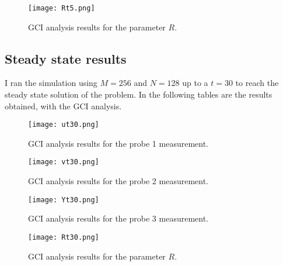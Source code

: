 \begin{figure}[H]
\centering     %
\texttt{[image: Rt5.png]}
\caption{GCI analysis results for the parameter $R$.}
\end{figure}

\subsection*{Steady state results}
I ran the simulation using $M=256$ and $N=128$ up to a $t=30$ to reach the steady state solution of the problem. In the following tables are the results obtained, with the GCI analysis.

\begin{figure}[H]
\centering     %
\texttt{[image: ut30.png]}
\caption{GCI analysis results for the probe 1 measurement.}
\end{figure}

\begin{figure}[H]
\centering     %
\texttt{[image: vt30.png]}
\caption{GCI analysis results for the probe 2 measurement.}
\end{figure}

\begin{figure}[H]
\centering     %
\texttt{[image: Yt30.png]}
\caption{GCI analysis results for the probe 3 measurement.}
\end{figure}

\begin{figure}[H]
\centering     %
\texttt{[image: Rt30.png]}
\caption{GCI analysis results for the parameter $R$.}
\end{figure}
